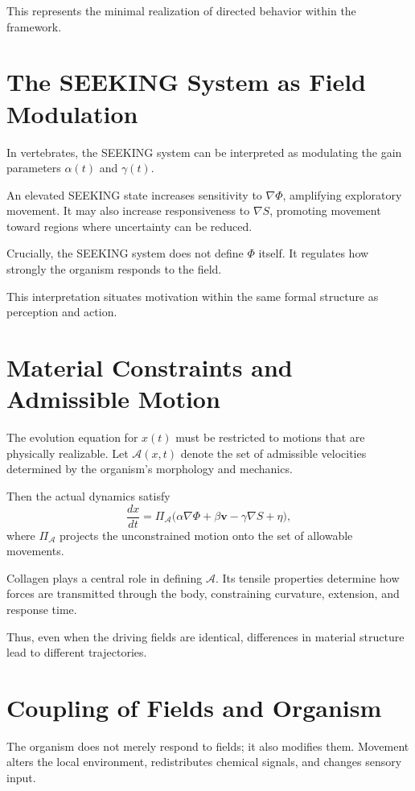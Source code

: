 \documentclass[11pt,oneside]{book}
\begin{document}
This represents the minimal realization of directed behavior within the framework.

\section{The SEEKING System as Field Modulation}

In vertebrates, the SEEKING system can be interpreted as modulating the gain parameters $\alpha(t)$ and $\gamma(t)$.

An elevated SEEKING state increases sensitivity to $\nabla \Phi$, amplifying exploratory movement. It may also increase responsiveness to $\nabla S$, promoting movement toward regions where uncertainty can be reduced.

Crucially, the SEEKING system does not define $\Phi$ itself. It regulates how strongly the organism responds to the field.

This interpretation situates motivation within the same formal structure as perception and action.

\section{Material Constraints and Admissible Motion}

The evolution equation for $x(t)$ must be restricted to motions that are physically realizable. Let $\mathcal{A}(x,t)$ denote the set of admissible velocities determined by the organism’s morphology and mechanics.

Then the actual dynamics satisfy
\[
\frac{dx}{dt} = \Pi_{\mathcal{A}} \big( \alpha\nabla \Phi + \beta \mathbf{v} - \gamma \nabla S + \eta \big),
\]
where $\Pi_{\mathcal{A}}$ projects the unconstrained motion onto the set of allowable movements.

Collagen plays a central role in defining $\mathcal{A}$. Its tensile properties determine how forces are transmitted through the body, constraining curvature, extension, and response time.

Thus, even when the driving fields are identical, differences in material structure lead to different trajectories.

\section{Coupling of Fields and Organism}

The organism does not merely respond to fields; it also modifies them. Movement alters the local environment, redistributes chemical signals, and changes sensory input.
\end{document}

